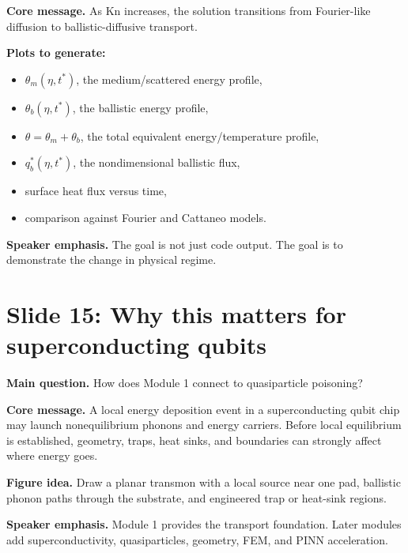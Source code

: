 \documentclass[11pt]{article}
\begin{document}
\textbf{Core message.} As \(\mathrm{Kn}\) increases, the solution transitions from Fourier-like diffusion to ballistic-diffusive transport.

\textbf{Plots to generate:}
\begin{itemize}[leftmargin=1.6em]
    \item \(\theta_m(\eta,t^*)\), the medium/scattered energy profile,
    \item \(\theta_b(\eta,t^*)\), the ballistic energy profile,
    \item \(\theta=\theta_m+\theta_b\), the total equivalent energy/temperature profile,
    \item \(q_b^*(\eta,t^*)\), the nondimensional ballistic flux,
    \item surface heat flux versus time,
    \item comparison against Fourier and Cattaneo models.
\end{itemize}

\textbf{Speaker emphasis.} The goal is not just code output. The goal is to demonstrate the change in physical regime.

\section{Slide 15: Why this matters for superconducting qubits}
\begin{physicsbox}
\textbf{Main question.} How does Module 1 connect to quasiparticle poisoning?
\end{physicsbox}

\textbf{Core message.} A local energy deposition event in a superconducting qubit chip may launch nonequilibrium phonons and energy carriers. Before local equilibrium is established, geometry, traps, heat sinks, and boundaries can strongly affect where energy goes.

\textbf{Figure idea.} Draw a planar transmon with a local source near one pad, ballistic phonon paths through the substrate, and engineered trap or heat-sink regions.

\textbf{Speaker emphasis.} Module 1 provides the transport foundation. Later modules add superconductivity, quasiparticles, geometry, FEM, and PINN acceleration.
\end{document}
